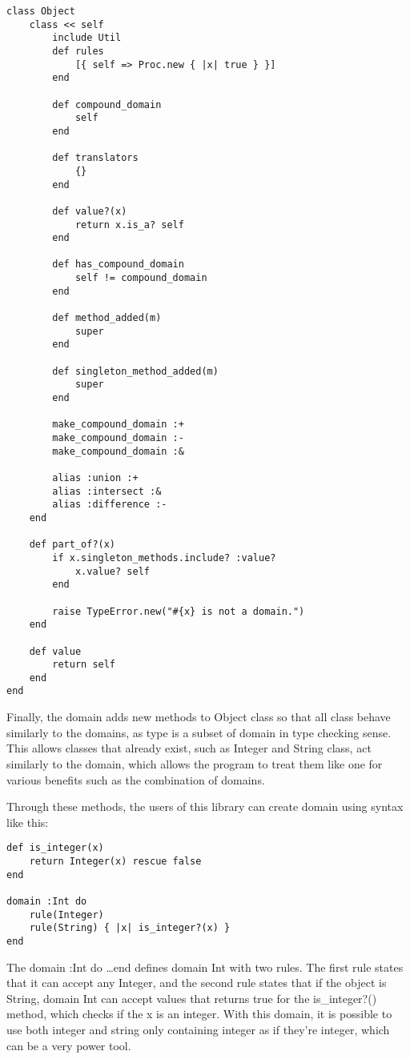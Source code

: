 \begin{lstlisting}[caption={Monkey patching Object class}]
class Object
    class << self
        include Util
        def rules
            [{ self => Proc.new { |x| true } }]
        end

        def compound_domain
            self
        end

        def translators
            {}
        end

        def value?(x)
            return x.is_a? self
        end

        def has_compound_domain
            self != compound_domain
        end

        def method_added(m)
            super
        end

        def singleton_method_added(m)
            super
        end

        make_compound_domain :+
        make_compound_domain :-
        make_compound_domain :&

        alias :union :+
        alias :intersect :&
        alias :difference :-
    end

    def part_of?(x)
        if x.singleton_methods.include? :value?
            x.value? self
        end

        raise TypeError.new("#{x} is not a domain.")
    end

    def value
        return self
    end
end
\end{lstlisting}

Finally, the domain adds new methods to Object class so that all class behave similarly to the domains, as type is a subset of domain in type checking sense.  This allows classes that already exist, such as Integer and String class, act similarly to the domain, which allows the program to treat them like one for various benefits such as the combination of domains.

Through these methods, the users of this library can create domain using syntax like this:

\begin{lstlisting}[caption={Sample code: declaration of domains}]
def is_integer(x)
    return Integer(x) rescue false
end

domain :Int do
    rule(Integer)
    rule(String) { |x| is_integer?(x) }
end
\end{lstlisting}

The domain :Int do \ldots end defines domain Int with two rules.  The first rule states that it can accept any Integer, and the second rule states that if the object is String, domain Int can accept values that returns true for the is\_integer?() method, which checks if the x is an integer.  With this domain, it is possible to use both integer and string only containing integer as if they're integer, which can be a very power tool.

